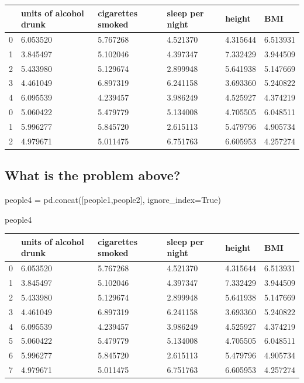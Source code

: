 \documentclass[
  letterpaper,
  DIV=11,
  numbers=noendperiod]{scrreprt}
\newenvironment{Shaded}{\begin{snugshade}}{\end{snugshade}}
\newcommand{\NormalTok}[1]{\textcolor[rgb]{0.00,0.23,0.31}{#1}}
\newcommand{\OperatorTok}[1]{\textcolor[rgb]{0.37,0.37,0.37}{#1}}
\newcommand{\VariableTok}[1]{\textcolor[rgb]{0.07,0.07,0.07}{#1}}
\begin{document}
\begin{longtable}[]{@{}llllll@{}}
\toprule()
& units of alcohol drunk & cigarettes smoked & sleep per night & height
& BMI \\
\midrule()
\endhead
0 & 6.053520 & 5.767268 & 4.521370 & 4.315644 & 6.513931 \\
1 & 3.845497 & 5.102046 & 4.397347 & 7.332429 & 3.944509 \\
2 & 5.433980 & 5.129674 & 2.899948 & 5.641938 & 5.147669 \\
3 & 4.461049 & 6.897319 & 6.241158 & 3.693360 & 5.240822 \\
4 & 6.095539 & 4.239457 & 3.986249 & 4.525927 & 4.374219 \\
0 & 5.060422 & 5.479779 & 5.134008 & 4.705505 & 6.048511 \\
1 & 5.996277 & 5.845720 & 2.615113 & 5.479796 & 4.905734 \\
2 & 4.979671 & 5.011475 & 6.751763 & 6.605953 & 4.257274 \\
\bottomrule()
\end{longtable}

\hypertarget{what-is-the-problem-above}{%
\subsection{What is the problem
above?}\label{what-is-the-problem-above}}

\begin{Shaded}
\begin{Highlighting}[]
\NormalTok{people4 }\OperatorTok{=}\NormalTok{ pd.concat([people1,people2], ignore\_index}\OperatorTok{=}\VariableTok{True}\NormalTok{)}
\end{Highlighting}
\end{Shaded}

\begin{Shaded}
\begin{Highlighting}[]
\NormalTok{people4}
\end{Highlighting}
\end{Shaded}

\begin{longtable}[]{@{}llllll@{}}
\toprule()
& units of alcohol drunk & cigarettes smoked & sleep per night & height
& BMI \\
\midrule()
\endhead
0 & 6.053520 & 5.767268 & 4.521370 & 4.315644 & 6.513931 \\
1 & 3.845497 & 5.102046 & 4.397347 & 7.332429 & 3.944509 \\
2 & 5.433980 & 5.129674 & 2.899948 & 5.641938 & 5.147669 \\
3 & 4.461049 & 6.897319 & 6.241158 & 3.693360 & 5.240822 \\
4 & 6.095539 & 4.239457 & 3.986249 & 4.525927 & 4.374219 \\
5 & 5.060422 & 5.479779 & 5.134008 & 4.705505 & 6.048511 \\
6 & 5.996277 & 5.845720 & 2.615113 & 5.479796 & 4.905734 \\
7 & 4.979671 & 5.011475 & 6.751763 & 6.605953 & 4.257274 \\
\bottomrule()
\end{longtable}
\end{document}
